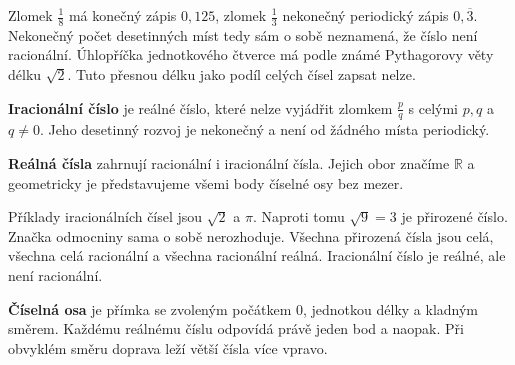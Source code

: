 \documentclass[11pt,a4paper]{article}
\begin{document}

Zlomek $\frac18$ má konečný zápis $0{,}125$, zlomek $\frac13$ nekonečný
periodický zápis $0{,}\overline3$. Nekonečný počet desetinných míst tedy
sám o sobě neznamená, že číslo není racionální.
Úhlopříčka jednotkového čtverce má podle známé Pythagorovy věty délku
$\sqrt2$. Tuto přesnou délku jako podíl celých čísel zapsat nelze.

\begin{definiceBox}[title={Definice - Iracionální číslo}]
\textbf{Iracionální číslo} je reálné číslo, které nelze vyjádřit
zlomkem $\frac pq$ s celými $p,q$ a $q\ne0$.
Jeho desetinný rozvoj je nekonečný a není od žádného místa periodický.
\end{definiceBox}

\begin{definiceBox}[title={Definice - Reálná čísla}]
\textbf{Reálná čísla} zahrnují racionální i iracionální čísla.
Jejich obor značíme $\mathbb R$ a geometricky je představujeme všemi
body číselné osy bez mezer.
\end{definiceBox}

Příklady iracionálních čísel jsou $\sqrt2$ a $\pi$. Naproti tomu
$\sqrt9=3$ je přirozené číslo. Značka odmocniny sama o sobě nerozhoduje.
Všechna přirozená čísla jsou celá, všechna celá racionální a všechna
racionální reálná. Iracionální číslo je reálné, ale není racionální.



\begin{definiceBox}[title={Definice - Číselná osa}]
\textbf{Číselná osa} je přímka se zvoleným počátkem $0$, jednotkou délky
a kladným směrem. Každému reálnému číslu odpovídá právě jeden bod a naopak.
Při obvyklém směru doprava leží větší čísla více vpravo.
\end{definiceBox}
\end{document}
